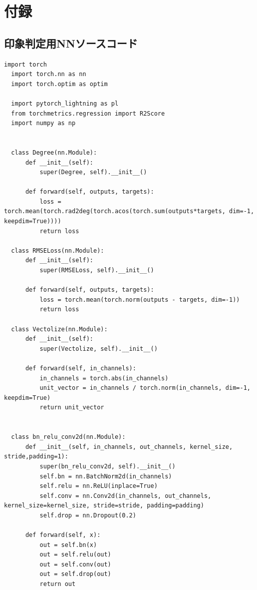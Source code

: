 \documentclass[a4paper,11pt,dvipdfmx]{jreport}
\begin{document}
\newpage

\chapter*{付録}
\section*{印象判定用NNソースコード}
\begin{lstlisting}[caption=印象判定用NN{,} DenseNetに関するソースコード, label=source]
  import torch
  import torch.nn as nn
  import torch.optim as optim
  
  import pytorch_lightning as pl
  from torchmetrics.regression import R2Score
  import numpy as np
  
  
  class Degree(nn.Module):
      def __init__(self): 
          super(Degree, self).__init__()
  
      def forward(self, outputs, targets): 
          loss = torch.mean(torch.rad2deg(torch.acos(torch.sum(outputs*targets, dim=-1, keepdim=True))))
          return loss
  
  class RMSELoss(nn.Module):
      def __init__(self): 
          super(RMSELoss, self).__init__()
  
      def forward(self, outputs, targets): 
          loss = torch.mean(torch.norm(outputs - targets, dim=-1))
          return loss
  
  class Vectolize(nn.Module):
      def __init__(self):
          super(Vectolize, self).__init__()
  
      def forward(self, in_channels):
          in_channels = torch.abs(in_channels)
          unit_vector = in_channels / torch.norm(in_channels, dim=-1, keepdim=True)
          return unit_vector
  
  
  class bn_relu_conv2d(nn.Module):
      def __init__(self, in_channels, out_channels, kernel_size, stride,padding=1):
          super(bn_relu_conv2d, self).__init__()
          self.bn = nn.BatchNorm2d(in_channels)
          self.relu = nn.ReLU(inplace=True)
          self.conv = nn.Conv2d(in_channels, out_channels, kernel_size=kernel_size, stride=stride, padding=padding)
          self.drop = nn.Dropout(0.2)
  
      def forward(self, x):
          out = self.bn(x)
          out = self.relu(out)
          out = self.conv(out)
          out = self.drop(out)
          return out
  

\end{lstlisting}
\end{document}

